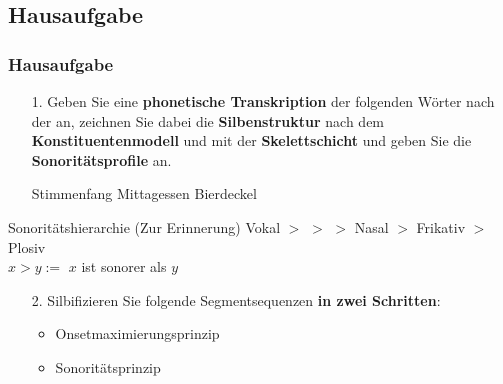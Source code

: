 {

\subsection{Hausaufgabe}


%	
%			
%			

\begin{frame}%
\frametitle{Hausaufgabe}
\begin{itemize}
	
	\item[1.] Geben Sie eine \textbf{phonetische Transkription} der folgenden Wörter nach der  an, zeichnen Sie dabei die \textbf{Silbenstruktur} nach dem \textbf{Konstituentenmodell} und mit der \textbf{Skelettschicht} und geben Sie die \textbf{Sonoritätsprofile} an.
	
	\eal\label{ex:HA1}
	\ex Stimmenfang \label{ex:HA1a}
	\ex Mittagessen\label{ex:HA1b}
	\ex Bierdeckel\label{ex:HA1c}
	\zl
\end{itemize}

\begin{block}{Sonoritätshierarchie (Zur Erinnerung)}
	Vokal $>$ \textipa{/\textscr /} $>$  $>$ Nasal $>$ Frikativ $>$ Plosiv \\
	$x > y :=$ $x$ ist sonorer als $y$
\end{block}

\end{frame}


\begin{frame}
\begin{itemize}
\item[2.] Silbifizieren Sie folgende Segmentsequenzen \textbf{in zwei Schritten}:
\begin{itemize}
	\item Onsetmaximierungsprinzip
	\item Sonoritätsprinzip
\end{itemize}


\end{itemize}
\end{frame}}
